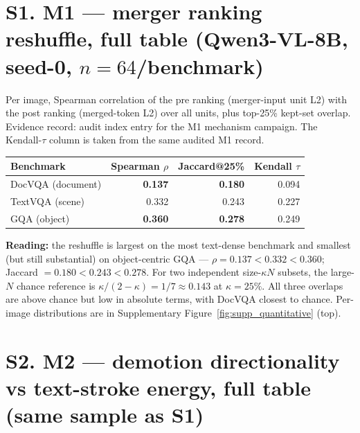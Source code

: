 \section*{S1. M1 --- merger ranking reshuffle, full table (Qwen3-VL-8B, seed-0, $n = 64$/benchmark)}

Per image, Spearman correlation of the pre ranking (merger-input unit L2) with
the post ranking (merged-token L2) over all units, plus top-25\% kept-set
overlap. Evidence record: audit index entry for the M1
mechanism campaign. The Kendall-$\tau$ column is taken from the same audited
M1 record.

\begin{table}[ht]
  \centering
  \scriptsize
  \setlength{\tabcolsep}{3pt}
  \begin{tabular}{@{}l r r r@{}}
    \toprule
    Benchmark & Spearman $\rho$ & Jaccard@25\% & Kendall $\tau$ \\
    \midrule
    DocVQA (document) & \textbf{0.137} & \textbf{0.180} & 0.094 \\
    TextVQA (scene)   & 0.332          & 0.243          & 0.227 \\
    GQA (object)      & \textbf{0.360} & \textbf{0.278} & 0.249 \\
    \bottomrule
  \end{tabular}
\end{table}

\noindent\textbf{Reading:} the reshuffle is largest on the most text-dense
benchmark and smallest (but still substantial) on object-centric GQA ---
$\rho = 0.137 < 0.332 < 0.360$; Jaccard $= 0.180 < 0.243 < 0.278$. For two
independent size-$\kappa N$ subsets, the large-$N$ chance reference is
$\kappa/(2-\kappa)=1/7\approx0.143$ at $\kappa=25\%$. All three overlaps are
above chance but low in absolute terms, with DocVQA closest to chance. Per-image distributions are in
Supplementary Figure~\ref{fig:supp_quantitative} (top).

\section*{S2. M2 --- demotion directionality vs text-stroke energy, full table (same sample as S1)}

